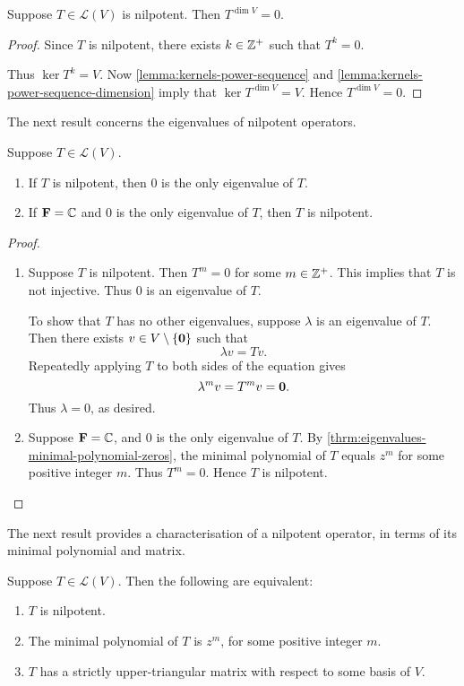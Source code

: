 \begin{lemma}
Suppose $T\in\mathcal{L}(V)$ is nilpotent. Then $T^{\dim V}=0$.
\end{lemma}

\begin{proof}
Since $T$ is nilpotent, there exists $k\in\mathbb Z^+$ such that $T^k=0$.

Thus $\ker T^k=V$. Now \ref{lemma:kernels-power-sequence} and \ref{lemma:kernels-power-sequence-dimension} imply that $\ker T^{\dim V}=V$. Hence $T^{\dim V}=0$.
\end{proof}

The next result concerns the eigenvalues of nilpotent operators.

\begin{proposition}
Suppose $T\in\mathcal{L}(V)$.
\begin{enumerate}[label=(\roman*)]
\item If $T$ is nilpotent, then $0$ is the only eigenvalue of $T$.
\item If $\mathbf F=\mathbb C$ and $0$ is the only eigenvalue of $T$, then $T$ is nilpotent.
\end{enumerate}
\end{proposition}

\begin{proof} \
\begin{enumerate}[label=(\roman*)]
\item Suppose $T$ is nilpotent. Then $T^m=0$ for some $m\in\mathbb Z^+$. This implies that $T$ is not injective. Thus $0$ is an eigenvalue of $T$.

To show that $T$ has no other eigenvalues, suppose $\lambda$ is an eigenvalue of $T$. 
Then there exists $v\in V\setminus\{\vb{0}\}$ such that
\[\lambda v=Tv.\]
Repeatedly applying $T$ to both sides of the equation gives
\[\lambda^m v=T^m v=\vb{0}.\]
Thus $\lambda=0$, as desired.

\item Suppose $\mathbf F=\mathbb C$, and $0$ is the only eigenvalue of $T$. 
By \ref{thrm:eigenvalues-minimal-polynomial-zeros}, the minimal polynomial of $T$ equals $z^m$ for some positive integer $m$.
Thus $T^m=0$.
Hence $T$ is nilpotent.
\end{enumerate}
\end{proof}

The next result provides a characterisation of a nilpotent operator, in terms of its minimal polynomial and matrix.

\begin{proposition}
Suppose $T\in\mathcal{L}(V)$. Then the following are equivalent:
\begin{enumerate}[label=(\roman*)]
\item $T$ is nilpotent.
\item The minimal polynomial of $T$ is $z^m$, for some positive integer $m$.
\item $T$ has a strictly upper-triangular matrix with respect to some basis of $V$.
\end{enumerate}
\end{proposition}

